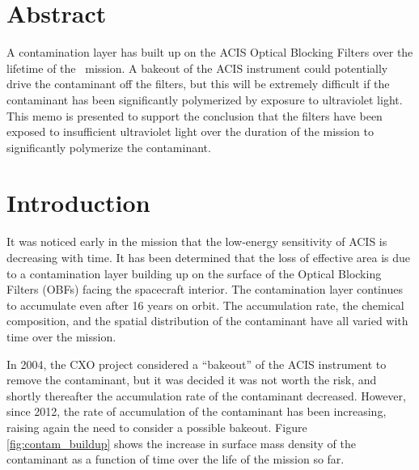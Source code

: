 \documentclass[11pt]{article}
\begin{document}


\Date{\today}


\memo{}

\section{Abstract}

A contamination layer has built up on the ACIS Optical Blocking Filters over the
lifetime of the \chandra~mission. A bakeout of the ACIS instrument could potentially
drive the contaminant off the filters, but this will be extremely difficult if the
contaminant has been significantly polymerized by exposure to ultraviolet light.
This memo is presented to support the conclusion that the filters have been exposed
to insufficient ultraviolet light over the duration of the mission to significantly
polymerize the contaminant.

\section{Introduction}

It was noticed early in the mission that the low-energy sensitivity of ACIS is
decreasing with time. It has been determined that the loss of effective area is
due to a contamination layer building up on the surface of the Optical Blocking
Filters (OBFs) facing the spacecraft interior. The contamination layer continues
to accumulate even after 16 years on orbit. The accumulation rate, the chemical
composition, and the spatial distribution of the contaminant have all varied with
time over the mission.

In 2004, the CXO project considered a ``bakeout'' of the ACIS instrument to remove
the contaminant, but it was decided it was not worth the risk, and shortly thereafter
the accumulation rate of the contaminant decreased. However, since 2012, the rate of
accumulation of the contaminant has been increasing, raising again the need to consider
a possible bakeout. Figure \ref{fig:contam_buildup} shows the increase in surface mass
density of the contaminant as a function of time over the life of the mission so far.
\end{document}
